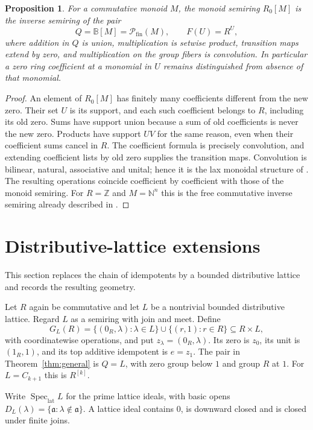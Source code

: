 \documentclass[11pt]{amsart}
\newcommand{\B}{\mathbb B}
\newcommand{\Z}{\mathbb Z}
\newcommand{\N}{\mathbb N}
\DeclareMathOperator{\Spec}{Spec}
\newtheorem{proposition}[theorem]{Proposition}
\theoremstyle{definition}
\theoremstyle{remark}
\begin{document}
\begin{proposition}\label{prop:monoid}
For a commutative monoid $M$, the monoid semiring $R_0[M]$ is the inverse semiring of the pair
\[
 Q=\B[M]=\mathcal P_{\mathrm{fin}}(M),\qquad F(U)=R^U,
\]
where addition in $Q$ is union, multiplication is setwise product, transition maps extend by zero, and multiplication on the group fibers is convolution. In particular a zero ring coefficient at a monomial in $U$ remains distinguished from absence of that monomial.
\end{proposition}
\begin{proof}
An element of $R_0[M]$ has finitely many coefficients different from the new zero. Their set $U$ is its support, and each such coefficient belongs to $R$, including its old zero. Sums have support union because a sum of old coefficients is never the new zero. Products have support $UV$ for the same reason, even when their coefficient sums cancel in $R$. The coefficient formula is precisely convolution, and extending coefficient lists by old zero supplies the transition maps. Convolution is bilinear, natural, associative and unital; hence it is the lax monoidal structure of \cite[Theorem~8.5]{CFMM}. The resulting operations coincide coefficient by coefficient with those of the monoid semiring. For $R=\Z$ and $M=\N^n$ this is the free commutative inverse semiring already described in \cite[Proposition~5.2]{FGJM}.
\end{proof}

\section{Distributive-lattice extensions}\label{sec:latticeextension}
This section replaces the chain of idempotents by a bounded distributive lattice and records the resulting geometry.

Let $R$ again be commutative and let $L$ be a nontrivial bounded distributive lattice. Regard $L$ as a semiring with join and meet. Define
\[
 G_L(R)=\{(0_R,\lambda):\lambda\in L\}\cup\{(r,1):r\in R\}
 \subseteq R\times L,
\]
with coordinatewise operations, and put $z_\lambda=(0_R,\lambda)$. Its zero is $z_0$, its unit is $(1_R,1)$, and its top additive idempotent is $e=z_1$. The pair in Theorem~\ref{thm:general} is $Q=L$, with zero group below $1$ and group $R$ at $1$. For $L=C_{k+1}$ this is $R^{[k]}$.

Write $\Spec_{\mathrm{lat}}L$ for the prime lattice ideals, with basic opens $D_L(\lambda)=\{\mathfrak a:\lambda\notin\mathfrak a\}$. A lattice ideal contains $0$, is downward closed and is closed under finite joins.
\end{document}

